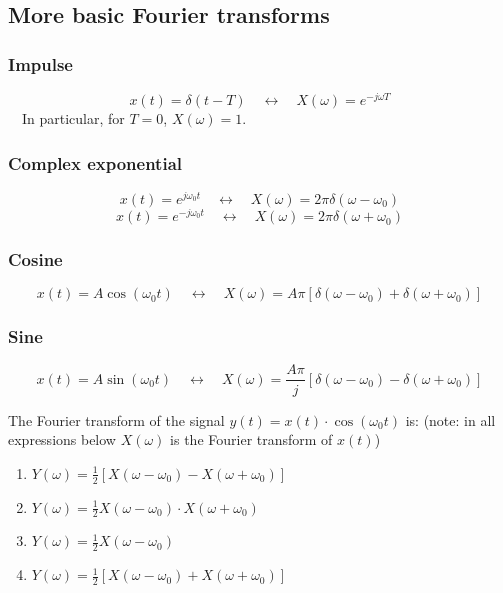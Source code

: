 \subsection{More basic Fourier transforms}

\subsubsection{Impulse}
\[ x(t)=\delta(t-T) \quad \leftrightarrow \quad X(\omega)=e^{-j\omega T} \]
\ \ In particular, for $T=0$, $X(\omega)=1$.

\subsubsection{Complex exponential}
\[ x(t)=e^{j\omega_{0}t} \quad \leftrightarrow \quad X(\omega)=2\pi \delta(\omega-\omega_{0}) \]
\[ x(t)=e^{-j\omega_{0}t} \quad \leftrightarrow \quad X(\omega)=2\pi \delta(\omega+\omega_{0}) \]

\subsubsection{Cosine}
\[ x(t)=A\cos(\omega_{0} t) \quad \leftrightarrow \quad X(\omega)=A\pi[ \delta(\omega-\omega_{0})+ \delta(\omega+\omega_{0})] \]

\subsubsection{Sine}
\[ x(t)=A\sin(\omega_{0} t) \quad \leftrightarrow \quad X(\omega)=\frac{A \pi}{j}[ \delta(\omega-\omega_{0})- \delta(\omega+\omega_{0})] \]

\begin{q}{}
The Fourier transform of the signal $y(t) = x(t) \cdot \cos(\omega_{0}t)$ is: (note: in all expressions below $X(\omega)$ is the Fourier transform of $x(t)$)
\begin{enumerate}[label=(\alph*)]
    \item $Y(\omega) = \frac{1}{2}[X(\omega - \omega_{0}) - X(\omega + \omega_{0})]$
    \item $Y(\omega) = \frac{1}{2}X(\omega - \omega_{0}) \cdot X(\omega + \omega_{0})$
    \item $Y(\omega) = \frac{1}{2}X(\omega - \omega_{0})$
    \item $Y(\omega) = \frac{1}{2}[X(\omega - \omega_{0}) + X(\omega + \omega_{0})]$
\end{enumerate}
\end{q}

